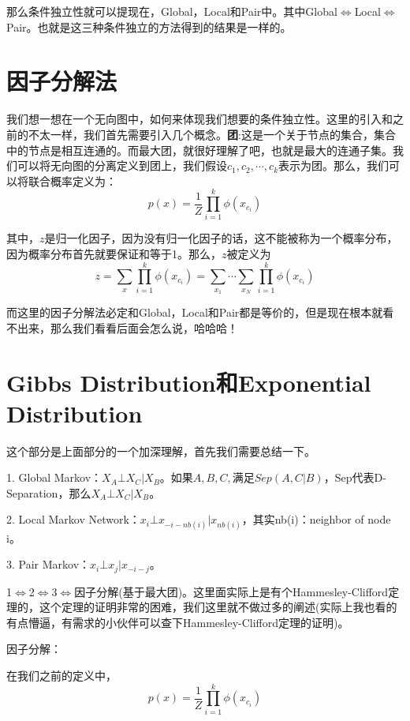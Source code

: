 \documentclass[a4paper]{article}
\begin{document}
那么条件独立性就可以提现在，Global，Local和Pair中。其中Global$\Leftrightarrow$Local$\Leftrightarrow$Pair。也就是这三种条件独立的方法得到的结果是一样的。

\section{因子分解法}
我们想一想在一个无向图中，如何来体现我们想要的条件独立性。这里的引入和之前的不太一样，我们首先需要引入几个概念。\textbf{团}:这是一个关于节点的集合，集合中的节点是相互连通的。而最大团，就很好理解了吧，也就是最大的连通子集。我们可以将无向图的分离定义到团上，我们假设$c_1,c_2,\cdots,c_k$表示为团。那么，我们可以将联合概率定义为：
\begin{equation}
    p(x) = \frac{1}{Z}\prod_{i=1}^k \phi (x_{c_i})
\end{equation}

其中，$z$是归一化因子，因为没有归一化因子的话，这不能被称为一个概率分布，因为概率分布首先就要保证和等于1。那么，$z$被定义为
\begin{equation}
    z = \sum_x \prod_{i=1}^k\phi(x_{c_i}) = \sum_{x_1}\cdots\sum_{x_N} \prod_{i=1}^k\phi(x_{c_i})
\end{equation}

而这里的因子分解法必定和Global，Local和Pair都是等价的，但是现在根本就看不出来，那么我们看看后面会怎么说，哈哈哈！

\section{Gibbs Distribution和Exponential Distribution}
这个部分是上面部分的一个加深理解，首先我们需要总结一下。

1. Global Markov：$X_A \bot X_C | X_B$。如果$A,B,C,$满足$Sep(A,C|B)$，Sep代表D-Separation，那么$X_A \bot X_C | X_B$。

2. Local Markov Network：$x_i\bot x_{-i-nb(i)}|x_{nb(i)}$，其实nb(i)：neighbor of node i。

3. Pair Markov：$x_i \bot x_j|x_{-i-j}$。

1$\Leftrightarrow$2$\Leftrightarrow$3$\Leftrightarrow$因子分解(基于最大团)。这里面实际上是有个Hammesley-Clifford定理的，这个定理的证明非常的困难，我们这里就不做过多的阐述(实际上我也看的有点懵逼，有需求的小伙伴可以查下Hammesley-Clifford定理的证明)。

\noindent 因子分解：

在我们之前的定义中，
\begin{equation}
    p(x) = \frac{1}{Z}\prod_{i=1}^k \phi(x_{c_i})
\end{equation}
\end{document}
